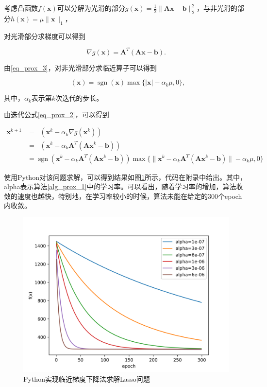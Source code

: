 \begin{solution}
    考虑凸函数$f(\bm{x})$可以分解为光滑的部分$g(\bm{x})=\frac{1}{2}\|\bm{A} \bm{x}-\bm{b}\|_{2}^{2}$，与非光滑的部分$h(\bm{x})=\mu\|\bm{x}\|_{1}$，

    对光滑部分求梯度可以得到

    \begin{equation*}
        \nabla g(\bm{x}) = \bm{A}^{T}(\bm{A} \bm{x}-\bm{b}).
    \end{equation*}

    由\ref{eq_prox_3}，对非光滑部分求临近算子可以得到

    \begin{equation*}
        \mathop{\mathrm{prox_{\alpha_{k}h}}}(\bm{x}) = \mathop{\mathrm{sgn}}(\bm{x})\max\{|\bm{x}|-\alpha_{k}\mu, 0\},
    \end{equation*}

    其中，$\alpha_{k}$表示第$k$次迭代的步长。

    由迭代公式\ref{eq_prox_2}，可以得到

    \begin{equation}
        \begin{split}
            \bm{x}^{k+1} &= \mathop{\mathrm{prox_{\alpha_{k}h}}}(\bm{x}^{k} - \alpha_{k}\nabla g(\bm{x}^{k})) \\
            &=\mathop{\mathrm{prox_{\alpha_{k}h}}}(\bm{x}^{k} - \alpha_{k}\bm{A}^{T}(\bm{A} \bm{x}^{k}-\bm{b})) \\
            &=\mathop{\mathrm{sgn}}(\bm{x}^{k} - \alpha_{k}\bm{A}^{T}(\bm{A} \bm{x}^{k}-\bm{b}))\max\{\|\bm{x}^{k} - \alpha_{k}\bm{A}^{T}(\bm{A} \bm{x}^{k}-\bm{b})\|-\alpha_{k}\mu, 0\}
        \end{split}
    \end{equation}

    使用Python对该问题求解，可以得到结果如图\ref{figure_prox}所示，代码在附录中给出。其中，alpha表示算法\ref{alg_prox_1}中的学习率。可以看出，随着学习率的增加，算法收敛的速度也越快，特别地，在学习率较小的时候，算法未能在给定的300个epoch内收敛。

    \begin{figure}[hbtp]
        \centering
        \includegraphics[width=150mm]{./Figures/prox.png}
        \caption{Python实现临近梯度下降法求解Lasso问题}
        \label{figure_prox}
    \end{figure}
\end{solution}